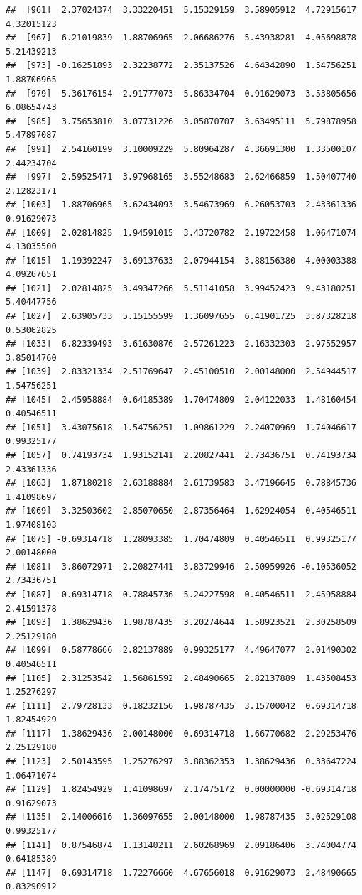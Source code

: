 \documentclass[
]{article}
\begin{document}
\begin{verbatim}
##  [961]  2.37024374  3.33220451  5.15329159  3.58905912  4.72915617  4.32015123
##  [967]  6.21019839  1.88706965  2.06686276  5.43938281  4.05698878  5.21439213
##  [973] -0.16251893  2.32238772  2.35137526  4.64342890  1.54756251  1.88706965
##  [979]  5.36176154  2.91777073  5.86334704  0.91629073  3.53805656  6.08654743
##  [985]  3.75653810  3.07731226  3.05870707  3.63495111  5.79878958  5.47897087
##  [991]  2.54160199  3.10009229  5.80964287  4.36691300  1.33500107  2.44234704
##  [997]  2.59525471  3.97968165  3.55248683  2.62466859  1.50407740  2.12823171
## [1003]  1.88706965  3.62434093  3.54673969  6.26053703  2.43361336  0.91629073
## [1009]  2.02814825  1.94591015  3.43720782  2.19722458  1.06471074  4.13035500
## [1015]  1.19392247  3.69137633  2.07944154  3.88156380  4.00003388  4.09267651
## [1021]  2.02814825  3.49347266  5.51141058  3.99452423  9.43180251  5.40447756
## [1027]  2.63905733  5.15155599  1.36097655  6.41901725  3.87328218  0.53062825
## [1033]  6.82339493  3.61630876  2.57261223  2.16332303  2.97552957  3.85014760
## [1039]  2.83321334  2.51769647  2.45100510  2.00148000  2.54944517  1.54756251
## [1045]  2.45958884  0.64185389  1.70474809  2.04122033  1.48160454  0.40546511
## [1051]  3.43075618  1.54756251  1.09861229  2.24070969  1.74046617  0.99325177
## [1057]  0.74193734  1.93152141  2.20827441  2.73436751  0.74193734  2.43361336
## [1063]  1.87180218  2.63188884  2.61739583  3.47196645  0.78845736  1.41098697
## [1069]  3.32503602  2.85070650  2.87356464  1.62924054  0.40546511  1.97408103
## [1075] -0.69314718  1.28093385  1.70474809  0.40546511  0.99325177  2.00148000
## [1081]  3.86072971  2.20827441  3.83729946  2.50959926 -0.10536052  2.73436751
## [1087] -0.69314718  0.78845736  5.24227598  0.40546511  2.45958884  2.41591378
## [1093]  1.38629436  1.98787435  3.20274644  1.58923521  2.30258509  2.25129180
## [1099]  0.58778666  2.82137889  0.99325177  4.49647077  2.01490302  0.40546511
## [1105]  2.31253542  1.56861592  2.48490665  2.82137889  1.43508453  1.25276297
## [1111]  2.79728133  0.18232156  1.98787435  3.15700042  0.69314718  1.82454929
## [1117]  1.38629436  2.00148000  0.69314718  1.66770682  2.29253476  2.25129180
## [1123]  2.50143595  1.25276297  3.88362353  1.38629436  0.33647224  1.06471074
## [1129]  1.82454929  1.41098697  2.17475172  0.00000000 -0.69314718  0.91629073
## [1135]  2.14006616  1.36097655  2.00148000  1.98787435  3.02529108  0.99325177
## [1141]  0.87546874  1.13140211  2.60268969  2.09186406  3.74004774  0.64185389
## [1147]  0.69314718  1.72276660  4.67656018  0.91629073  2.48490665  0.83290912

\end{verbatim}
\end{document}
